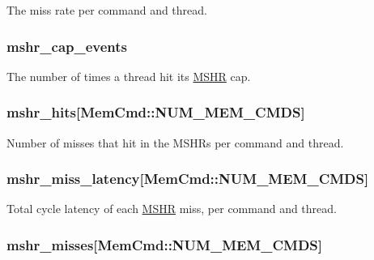 \label{group__CacheStatistics_gabe84abb4bee43d594923487ba5e013c1}
The miss rate per command and thread. \hypertarget{group__CacheStatistics_gab4ea8c6f8941356804bb9de4885a7ff4}{
\subsubsection[{mshr\_\-cap\_\-events}]{ mshr\_\-cap\_\-events}}
\label{group__CacheStatistics_gab4ea8c6f8941356804bb9de4885a7ff4}
The number of times a thread hit its \hyperlink{classMSHR}{MSHR} cap. \hypertarget{group__CacheStatistics_ga92faf658f75559bd75a8839d4de1f8a9}{
\subsubsection[{mshr\_\-hits}]{ mshr\_\-hits\mbox{[}MemCmd::NUM\_\-MEM\_\-CMDS\mbox{]}}}
\label{group__CacheStatistics_ga92faf658f75559bd75a8839d4de1f8a9}
Number of misses that hit in the MSHRs per command and thread. \hypertarget{group__CacheStatistics_gacfad5551221a8363918fd4b484112695}{
\subsubsection[{mshr\_\-miss\_\-latency}]{ mshr\_\-miss\_\-latency\mbox{[}MemCmd::NUM\_\-MEM\_\-CMDS\mbox{]}}}
\label{group__CacheStatistics_gacfad5551221a8363918fd4b484112695}
Total cycle latency of each \hyperlink{classMSHR}{MSHR} miss, per command and thread. \hypertarget{group__CacheStatistics_gaececf7d3c236db3a8f26999e5330a7f8}{
\subsubsection[{mshr\_\-misses}]{ mshr\_\-misses\mbox{[}MemCmd::NUM\_\-MEM\_\-CMDS\mbox{]}}}
